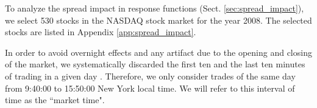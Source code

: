 To analyze the spread impact in response functions (Sect.
\ref{sec:spread_impact}), we select 530 stocks in the NASDAQ stock market for
the year 2008. The selected stocks are listed in Appendix
\ref{app:spread_impact}.

In order to avoid overnight effects and any artifact due to the opening and
closing of the market, we systematically discarded the first ten and the last
ten minutes of trading in a given day
\cite{Bouchaud_2004,large_prices_changes,spread_changes_affect,Wang_2016_cross}.
Therefore, we only consider trades of the same day from 9:40:00 to 15:50:00
New York local time. We will refer to this interval of time as the ``market
time".
